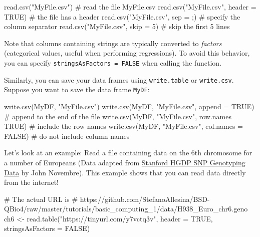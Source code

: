 \documentclass[
  letterpaper,
  DIV=11,
  numbers=noendperiod]{scrreprt}
\newenvironment{Shaded}{\begin{snugshade}}{\end{snugshade}}
\newcommand{\AttributeTok}[1]{\textcolor[rgb]{0.40,0.45,0.13}{#1}}
\newcommand{\CommentTok}[1]{\textcolor[rgb]{0.37,0.37,0.37}{#1}}
\newcommand{\ConstantTok}[1]{\textcolor[rgb]{0.56,0.35,0.01}{#1}}
\newcommand{\DecValTok}[1]{\textcolor[rgb]{0.68,0.00,0.00}{#1}}
\newcommand{\FunctionTok}[1]{\textcolor[rgb]{0.28,0.35,0.67}{#1}}
\newcommand{\NormalTok}[1]{\textcolor[rgb]{0.00,0.23,0.31}{#1}}
\newcommand{\StringTok}[1]{\textcolor[rgb]{0.13,0.47,0.30}{#1}}
\begin{document}
\begin{Shaded}
\begin{Highlighting}[]
\FunctionTok{read.csv}\NormalTok{(}\StringTok{"MyFile.csv"}\NormalTok{) }\CommentTok{\# read the file MyFile.csv}
\FunctionTok{read.csv}\NormalTok{(}\StringTok{"MyFile.csv"}\NormalTok{, }\AttributeTok{header =} \ConstantTok{TRUE}\NormalTok{) }\CommentTok{\# the file has a header}
\FunctionTok{read.csv}\NormalTok{(}\StringTok{"MyFile.csv"}\NormalTok{, }\AttributeTok{sep =} \StringTok{\textquotesingle{};\textquotesingle{}}\NormalTok{) }\CommentTok{\# specify the column separator}
\FunctionTok{read.csv}\NormalTok{(}\StringTok{"MyFile.csv"}\NormalTok{, }\AttributeTok{skip =} \DecValTok{5}\NormalTok{) }\CommentTok{\# skip the first 5 lines}
\end{Highlighting}
\end{Shaded}

Note that columns containing strings are typically converted to
\emph{factors} (categorical values, useful when performing regressions).
To avoid this behavior, you can specify
\texttt{stringsAsFactors\ =\ FALSE} when calling the function.

Similarly, you can save your data frames using \texttt{write.table} or
\texttt{write.csv}. Suppose you want to save the data frame
\texttt{MyDF}:

\begin{Shaded}
\begin{Highlighting}[]
\FunctionTok{write.csv}\NormalTok{(MyDF, }\StringTok{"MyFile.csv"}\NormalTok{) }
\FunctionTok{write.csv}\NormalTok{(MyDF, }\StringTok{"MyFile.csv"}\NormalTok{, }\AttributeTok{append =} \ConstantTok{TRUE}\NormalTok{) }\CommentTok{\# append to the end of the file }
\FunctionTok{write.csv}\NormalTok{(MyDF, }\StringTok{"MyFile.csv"}\NormalTok{, }\AttributeTok{row.names =} \ConstantTok{TRUE}\NormalTok{) }\CommentTok{\# include the row names}
\FunctionTok{write.csv}\NormalTok{(MyDF, }\StringTok{"MyFile.csv"}\NormalTok{, }\AttributeTok{col.names =} \ConstantTok{FALSE}\NormalTok{) }\CommentTok{\# do not include column names}
\end{Highlighting}
\end{Shaded}

Let's look at an example: Read a file containing data on the 6th
chromosome for a number of Europeans (Data adapted from
\href{hagsc.org/hgdp/}{Stanford HGDP SNP Genotyping Data} by John
Novembre). This example shows that you can read data directly from the
internet!

\begin{Shaded}
\begin{Highlighting}[]
\NormalTok{\# The actual URL is}
\NormalTok{\# https://github.com/StefanoAllesina/BSD{-}QBio4/raw/master/tutorials/basic\_computing\_1/data/H938\_Euro\_chr6.geno}
\NormalTok{ch6 \textless{}{-} read.table("https://tinyurl.com/y7vctq3v", }
\NormalTok{                  header = TRUE, stringsAsFactors = FALSE)}
\end{Highlighting}
\end{Shaded}
\end{document}
